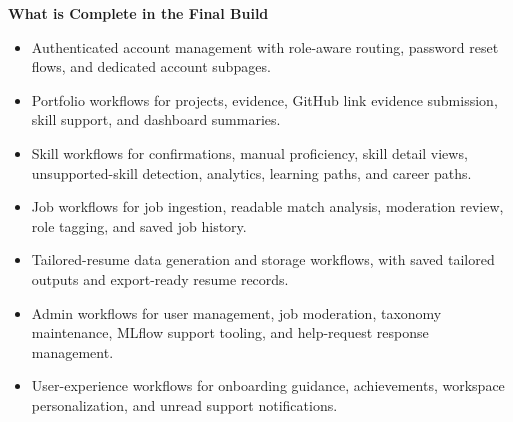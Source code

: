 \documentclass[11pt]{article}
\begin{document}
\vspace{0.75em}
\noindent\textbf{What is Complete in the Final Build}
\begin{itemize}
  \item Authenticated account management with role-aware routing, password reset flows, and dedicated account subpages.
  \item Portfolio workflows for projects, evidence, GitHub link evidence submission, skill support, and dashboard summaries.
  \item Skill workflows for confirmations, manual proficiency, skill detail views, unsupported-skill detection, analytics, learning paths, and career paths.
  \item Job workflows for job ingestion, readable match analysis, moderation review, role tagging, and saved job history.
  \item Tailored-resume data generation and storage workflows, with saved tailored outputs and export-ready resume records.
  \item Admin workflows for user management, job moderation, taxonomy maintenance, MLflow support tooling, and help-request response management.
  \item User-experience workflows for onboarding guidance, achievements, workspace personalization, and unread support notifications.
\end{itemize}
\end{document}
